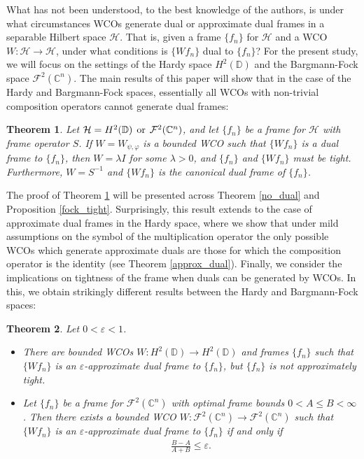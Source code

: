 \documentclass{amsart}
\newtheorem{thm}{Theorem}[section]
\theoremstyle{definition}
\theoremstyle{remark}
\numberwithin{equation}{section}
\begin{document}
What has not been understood, to the best knowledge of the authors, is under what circumstances WCOs generate dual or approximate dual frames in a separable Hilbert space $\mathcal{H}$. That is, given a frame $\{f_{n}\}$ for $\mathcal{H}$ and a WCO $W:\mathcal{H}\to\mathcal{H}$, under what conditions  is $\{Wf_{n}\}$ dual to $\{f_{n}\}$? For the present study, we will focus on the settings of the Hardy space $H^{2}(\mathbb{D})$ and the Bargmann-Fock space $\mathcal{F}^{2}(\mathbb{C}^{n})$. 
The main results of this paper will show that in the case of the Hardy and Bargmann-Fock spaces, essentially all WCOs with non-trivial composition operators cannot generate dual frames:
\begin{thm}\label{main_1}
    Let $\mathcal{H}=H^{2}(\mathbb{D})\hspace{.15cm}\text{or}\hspace{.15cm}\mathcal{F}^{2}(\mathbb{C}^{n})$, and let $\{f_{n}\}$ be a frame for $\mathcal{H}$ with frame operator $S$. If $W=W_{\psi,\varphi}$ is a bounded WCO such that $\{Wf_{n}\}$ is a dual frame to $\{f_{n}\}$, then $W = \lambda I$ for some $\lambda>0$, and $\{f_{n}\}$ and $\{Wf_{n}\}$ must be tight. Furthermore, $W = S^{-1}$ and $\{Wf_{n}\}$ is the canonical dual frame of $\{f_{n}\}$.
\end{thm}
The proof of Theorem \ref{main_1} will be presented across Theorem \ref{no_dual} and Proposition \ref{fock_tight}. Surprisingly, this result extends to the case of approximate dual frames in the Hardy space, where we show that under mild assumptions on the symbol of the multiplication operator the only possible WCOs which generate approximate duals are those for which the composition operator is the identity (see Theorem \ref{approx_dual}).  Finally, we consider the implications on tightness of the frame when duals can be generated by WCOs. In this, we obtain strikingly different results between the Hardy and Bargmann-Fock spaces:
\begin{thm}\label{main_2}
    Let $0<\varepsilon<1$. 
    \begin{itemize}
        \item[1.] There are bounded WCOs $W:H^{2}(\mathbb{D})\to H^{2}(\mathbb{D})$ and frames $\{f_{n}\}$ such that $\{Wf_{n}\}$ is an $\varepsilon$-approximate dual frame to $\{f_{n}\}$, but $\{f_{n}\}$ is not approximately tight.
        \item[2.] Let $\{f_{n}\}$ be a frame for $\mathcal{F}^{2}(\mathbb{C}^{n})$ with optimal frame bounds $0<A\leq B<\infty$. Then there exists a bounded WCO $W:\mathcal{F}^{2}(\mathbb{C}^{n})\to\mathcal{F}^{2}(\mathbb{C}^{n})$ such that $\{Wf_{n}\}$ is an $\varepsilon$-approximate dual frame to $\{f_{n}\}$ if and only if 
        \begin{align*}
            \frac{B-A}{A+B}\leq\varepsilon.
        \end{align*}
    \end{itemize}
\end{thm}
\end{document}
